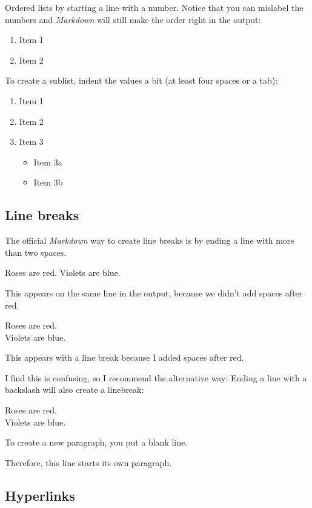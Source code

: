 \documentclass[a4paper, nobind]{templates/ociamthesis}
\providecommand{\tightlist}{%
  \setlength{\itemsep}{0pt}\setlength{\parskip}{0pt}}
\begin{document}
Ordered lists by starting a line with a number.
Notice that you can mislabel the numbers and \emph{Markdown} will still make the order right in the output:

\begin{enumerate}
\def\labelenumi{\arabic{enumi}.}
\tightlist
\item
  Item 1
\item
  Item 2
\end{enumerate}

To create a sublist, indent the values a bit (at least four spaces or a tab):

\begin{enumerate}
\def\labelenumi{\arabic{enumi}.}
\tightlist
\item
  Item 1
\item
  Item 2
\item
  Item 3

  \begin{itemize}
  \tightlist
  \item
    Item 3a
  \item
    Item 3b
  \end{itemize}
\end{enumerate}

\hypertarget{line-breaks}{%
\subsection{Line breaks}\label{line-breaks}}

The official \emph{Markdown} way to create line breaks is by ending a line with more than two spaces.

Roses are red.
Violets are blue.

This appears on the same line in the output, because we didn't add spaces after red.

Roses are red.\\
Violets are blue.

This appears with a line break because I added spaces after red.

I find this is confusing, so I recommend the alternative way: Ending a line with a backslash will also create a linebreak:

Roses are red.\\
Violets are blue.

To create a new paragraph, you put a blank line.

Therefore, this line starts its own paragraph.

\hypertarget{hyperlinks}{%
\subsection{Hyperlinks}\label{hyperlinks}}
\end{document}
